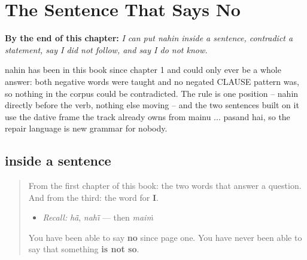 
\chapter{The Sentence That Says No}
\label{ch:pa-sentence-that-says-no}

\begin{chapteropening}
\textbf{By the end of this chapter:} \emph{I can put nahin inside a sentence, contradict a statement, say I did not follow, and say I do not know.}

nahin has been in this book since chapter 1 and could only ever be a whole answer: both negative words were taught and no negated CLAUSE pattern was, so nothing in the corpus could be contradicted. The rule is one position -- nahin directly before the verb, nothing else moving -- and the two sentences built on it use the dative frame the track already owns from mainu ... pasand hai, so the repair language is new grammar for nobody.
\end{chapteropening}

\section[\texorpdfstring{… \pa{ਨਹੀਂ} … (… nahī̃ …)}{… ਨਹੀਂ … (… nahī̃ …)}]{ inside a sentence}

\label{lesson:PA-C37-nahin-vaak}



\begin{quote}
From the first chapter of this book: the two words that answer a question. And from the third: the word for \textbf{I}.

\begin{itemize}
\raggedright
  \item \emph{Recall:} \emph{hā̃}, \emph{nahī̃} — then \emph{maiṁ}
\end{itemize}

You have been able to say \textbf{no} since page one. You have never been able to say that something \textbf{is not so}.
\end{quote}

